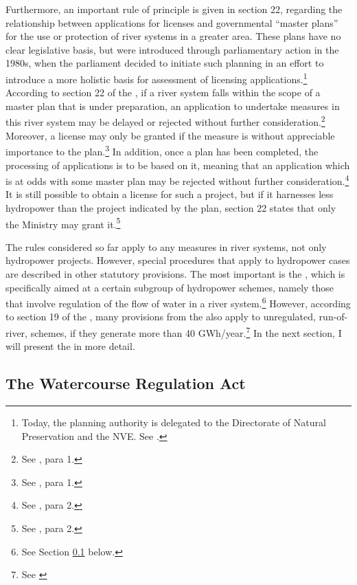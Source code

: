 Furthermore, an important rule of principle is given in section 22, regarding the relationship between applications for licenses and governmental ``master plans'' for the use or protection of river systems in a greater area. These plans have no clear legislative basis, but were introduced through parliamentary action in the 1980s, when the parliament decided to initiate such planning in an effort to introduce a more holistic basis for assessment of licensing applications.\footnote{Today, the planning authority is delegated to the Directorate of Natural Preservation and the NVE. See \cite{sp}.} %
According to section 22 of the \cite{wra00}, if a river system falls within the scope of a master plan that is under preparation, an application to undertake measures in this river system may be delayed or rejected without further consideration.\footnote{See \cite[22]{wra00}, para 1.} Moreover, a license may only be granted if the measure is without appreciable importance to the plan.\footnote{See \cite[22]{wra00}, para 1.} In addition, once a plan has been completed, the processing of applications is to be based on it, meaning that an application which is at odds with some master plan may be rejected without further consideration.\footnote{See \cite[22]{wra00}, para 2.} It is still possible to obtain a license for such a project, but if it harnesses less hydropower than the project indicated by the plan, section 22 states that only the Ministry may grant it.\footnote{See \cite[22]{wra00}, para 2.}

The rules considered so far apply to any measures in river systems, not only hydropower projects. However, special procedures that apply to hydropower cases are described in other statutory provisions. The most important is the \cite{wra17}, which is specifically aimed at a certain subgroup of hydropower schemes, namely those that involve regulation of the flow of water in a river system.\footnote{See Section \ref{sec:wra17} below.} However, according to section 19 of the \cite{wra00}, many provisions from the \cite{wra17} also apply to unregulated, run-of-river, schemes, if they generate more than 40 GWh/year.\footnote{See \cite[19]{wra00}} In the next section, I will present the \cite{wra17} in more detail.

\subsection{The Watercourse Regulation Act}\label{sec:wra17}

